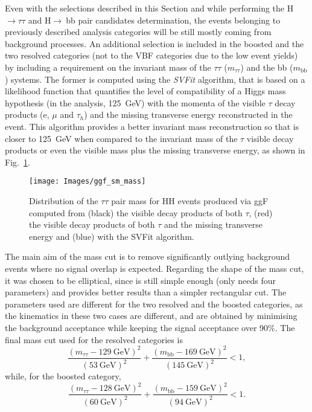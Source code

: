 \documentclass[../main.tex]{subfiles}
\begin{document}
Even with the selections described in this Section and while performing the H$\to\tau\tau$ and H$\to~$bb pair candidates determination, the events belonging to previously described analysis categories will be still mostly coming from background processes. An additional selection is included in the boosted and the two resolved categories (not to the VBF categories due to the low event yields) by including a requirement on the invariant mass of the $\tau\tau$ ($m_{\tau\tau}$) and the bb ($m_{\text{bb}}$) systems. The former is computed using the \textit{SVFit} \cite{hh:analysis:svfit} algorithm, that is based on a likelihood function that quantifies the level of compatibility of a Higgs mass hypothesis (in the \hhbbtt{} analysis, 125~GeV) with the momenta of the visible $\tau$ decay products (e, $\mu$ and $\tau_h$) and the missing transverse energy reconstructed in the event. This algorithm provides a better invariant mass reconstruction so that is closer to 125~GeV when compared to the invariant mass of the $\tau$ visible decay products or even the visible mass plus the missing transverse energy, as shown in Fig.~\ref{hh:fig:htt_masses}. 


\begin{figure}[h!]
\begin{center}
\texttt{[image: Images/ggf\_sm\_mass]}
\end{center}
\caption[\htt{} mass comparison]{Distribution of the $\tau\tau$ pair mass for HH events produced via ggF computed from (black) the visible decay products of both $\tau$, (red) the visible decay products of both $\tau$ and the missing transverse energy and (blue) with the SVFit algorithm.}
\label{hh:fig:htt_masses}
\end{figure}

The main aim of the mass cut is to remove significantly outlying background events where no signal overlap is expected. Regarding the shape of the mass cut, it was chosen to be elliptical, since is still simple enough (only needs four parameters) and provides better results than a simpler rectangular cut. The parameters used are different for the two resolved and the boosted categories, as the kinematics in these two cases are different, and are obtained by minimising the background acceptance while keeping the signal acceptance over 90\%. The final mass cut used for the resolved categories is
\begin{equation}
\frac{\left(m_{\tau\tau} - 129 ~\text{GeV}\right)^2}{(53~\text{GeV})^2} + \frac{\left(m_{\text{bb}} - 169 ~\text{GeV}\right)^2}{(145~\text{GeV})^2} < 1,
\end{equation}
while, for the boosted category,
\begin{equation}
\frac{\left(m_{\tau\tau} - 128 ~\text{GeV}\right)^2}{(60~\text{GeV})^2} + \frac{\left(m_{\text{bb}} - 159 ~\text{GeV}\right)^2}{(94~\text{GeV})^2} < 1.
\end{equation}
\end{document}
